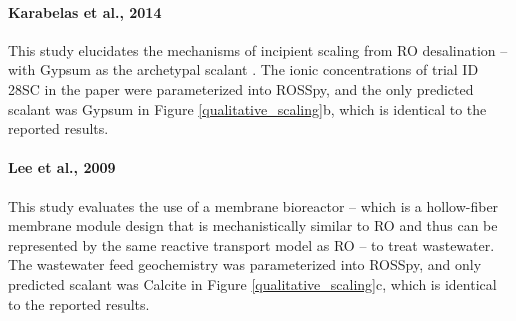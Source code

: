 \paragraph{Karabelas et al., 2014 \cite{Karabelas2014IncipientChannels}}
This study elucidates the mechanisms of incipient scaling from RO desalination -- with Gypsum as the archetypal scalant \cite{Lyster2009CoupledModule,Radu2014ASystems}. The ionic concentrations of trial ID 28SC in the paper were parameterized into ROSSpy, and the only predicted scalant was Gypsum in Figure \ref{qualitative_scaling}b, which is identical to the reported results.  

\paragraph{Lee et al., 2009 \cite{Lee2009MembraneWastewater}}
This study evaluates the use of a membrane bioreactor -- which is a hollow-fiber membrane module design that is mechanistically similar to RO and thus can be represented by the same reactive transport model as RO -- to treat wastewater. The wastewater feed geochemistry was parameterized into ROSSpy, and only predicted scalant was Calcite in Figure \ref{qualitative_scaling}c, which is identical to the reported results.


